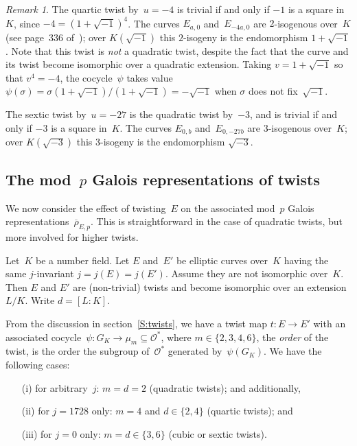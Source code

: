 \documentclass[twoside,leqno,symbols-for-thanks, draft]{rmi}
\numberwithin{equation}{section}
\newcommand{\rhobar}{{\overline{\rho}}}
\newcommand{\calO}{\mathcal{O}}
\theoremstyle{remark}
\newtheorem{remark}[theorem]{Remark}
\begin{document}
\begin{remark}\label{R:2-3-isog}
The quartic twist by~$u=-4$ is trivial if and only if $-1$ is a square
in~$K$, since $-4=(1+\sqrt{-1})^4$.  The curves $E_{a,0}$
and~$E_{-4a,0}$ are $2$-isogenous over~$K$ (see page~336
of~\cite{SilvermanI}); over $K(\sqrt{-1})$ this $2$-isogeny is the
endomorphism $1+\sqrt{-1}$.  Note that this twist is \emph{not} a
quadratic twist, despite the fact that the curve and its twist become
isomorphic over a quadratic extension.  Taking $v=1+\sqrt{-1}$ so that
$v^4=-4$, the cocycle~$\psi$ takes value
$\psi(\sigma)=\sigma(1+\sqrt{-1})/(1+\sqrt{-1})=-\sqrt{-1}$ when
$\sigma$ does not fix~$\sqrt{-1}$.

The sextic twist by~$u=-27$ is the quadratic twist by~$-3$, and is
trivial if and only if $-3$ is a square in~$K$.  The curves $E_{0,b}$
and~$E_{0,-27b}$ are $3$-isogenous over~$K$; over $K(\sqrt{-3})$ this
$3$-isogeny is the endomorphism $\sqrt{-3}$.
\end{remark}


\subsection{The mod~$p$ Galois representations of twists}\label{SS:GalRepTwist}
We now consider the effect of twisting~$E$ on the associated mod~$p$ Galois
representations~$\rhobar_{E,p}$.
This is straightforward in the case of quadratic
twists, but more involved for higher twists.


Let~$K$ be a number field. Let $E$ and~$E'$ be elliptic curves
over~$K$ having the same $j$-invariant $j = j(E) = j(E')$. Assume they
are not isomorphic over~$K$. Then $E$ and $E'$ are (non-trivial)
twists and become isomorphic over an extension $L/K$. Write $d = [L :
  K]$.

From the discussion in section~\ref{S:twists}, we have a twist map $t : E \to E'$ with
an associated cocycle~$\psi : G_K \to \mu_m \subseteq\calO^*$, where
$m\in\{2,3,4,6\}$, the \emph{order} of the twist, is the order the
subgroup of~$\calO^*$ generated by~$\psi(G_K)$.  We have the following
cases:
\begin{itemize}
 \item[(i)] for arbitrary~$j$: $m=d=2$ (quadratic twists); and
   additionally,
 \item[(ii)] for $j = 1728$ only: $m=4$ and $d \in \{2,4\}$  (quartic
   twists); and
  \item[(iii)] for $j = 0$ only: $m=d\in\{3,6\}$ (cubic or sextic twists).
\end{itemize}
\end{document}
